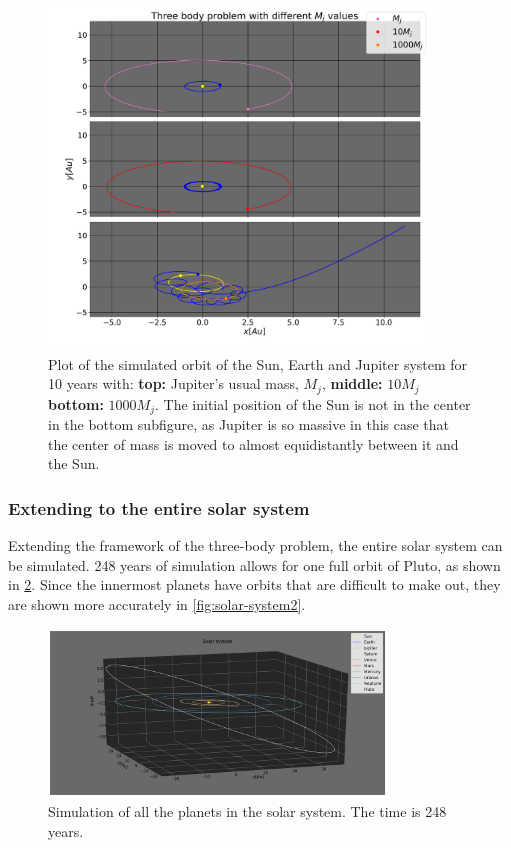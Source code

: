 \documentclass[../main.tex]{subfiles}
\begin{document}
\begin{figure}[htb!]
    \centering
    \includegraphics[width=0.9\textwidth]{../figures/three_body_problem.pdf}
    \caption{Plot of the simulated orbit of the Sun, Earth and Jupiter system for 10 years with: \textbf{top:} Jupiter's usual mass, $M_j$, \textbf{middle:} $10M_j$ \textbf{bottom:} $1000M_j$. The initial position of the Sun is not in the center in the bottom subfigure, as Jupiter is so massive in this case that the center of mass is moved to almost equidistantly between it and the Sun.}
    \label{fig:three-body-problem}
\end{figure}

\subsubsection{Extending to the entire solar system}

Extending the framework of the three-body problem, the entire solar system can be simulated. 248 years of simulation allows for one full orbit of Pluto, as shown in \cref{fig:solar-system1}. Since the innermost planets have orbits that are difficult to make out, they are shown more accurately in \cref{fig:solar-system2}.

\begin{figure}[htb!]
    \centering
    \includegraphics[trim=5.cm 0.cm 0.cm 0.cm, clip,width=0.8\textwidth]{../figures/solar_system1.pdf}
    \caption{Simulation of all the planets in the solar system. The time is 248 years.}
    \label{fig:solar-system1}
\end{figure}
\end{document}
